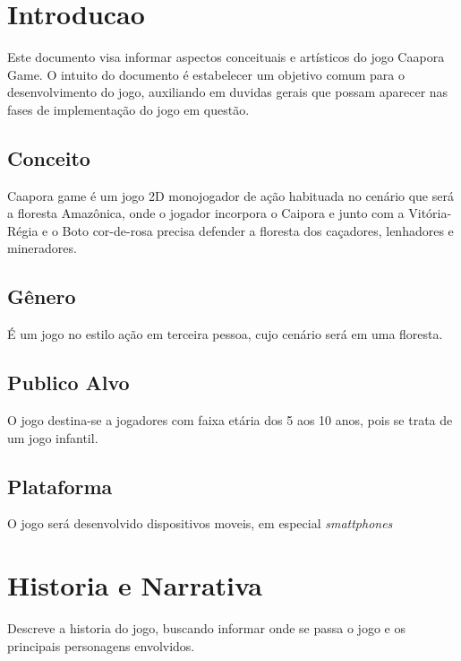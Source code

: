 \label{ap:game-design-document}


\section {Introducao}
\label{ap:introducao}

Este documento visa informar aspectos conceituais e artísticos do jogo Caapora Game. O intuito do documento é estabelecer um objetivo comum para o desenvolvimento do jogo, auxiliando em duvidas gerais que possam aparecer nas fases de implementação do jogo em questão.

\subsection {Conceito}

Caapora game é um jogo 2D monojogador de ação habituada no cenário que será a floresta Amazônica, onde o jogador incorpora o Caipora e junto com a Vitória-Régia e o Boto cor-de-rosa precisa defender a floresta dos caçadores, lenhadores e mineradores.

\subsection {Gênero}
É um jogo no estilo ação em terceira pessoa, cujo cenário será em uma floresta.

\subsection {Publico Alvo}
O jogo destina-se a jogadores com faixa etária dos 5 aos 10 anos, pois se trata de um jogo infantil.

\subsection {Plataforma}
O jogo será desenvolvido dispositivos moveis, em especial \textit {smattphones}

\section {Historia e Narrativa}
\label{ap:historia-e-narrativa}

Descreve a historia do jogo, buscando informar onde se passa o jogo e os principais personagens envolvidos.
